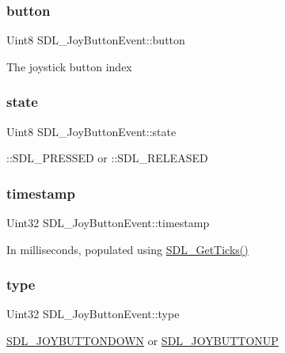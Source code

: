 \subsubsection{\texorpdfstring{button}{button}}
{\footnotesize\ttfamily Uint8 S\+D\+L\+\_\+\+Joy\+Button\+Event\+::button}

The joystick button index \mbox{\label{struct_s_d_l___joy_button_event_ad3b6f8d9aa2c5e694f664b97d12bcd2b}} 
\subsubsection{\texorpdfstring{state}{state}}
{\footnotesize\ttfamily Uint8 S\+D\+L\+\_\+\+Joy\+Button\+Event\+::state}

\+::\+S\+D\+L\+\_\+\+P\+R\+E\+S\+S\+ED or \+::\+S\+D\+L\+\_\+\+R\+E\+L\+E\+A\+S\+ED \mbox{\label{struct_s_d_l___joy_button_event_ab50b6f7d1ab3ac53df69fc2d6cf5fa2a}} 
\subsubsection{\texorpdfstring{timestamp}{timestamp}}
{\footnotesize\ttfamily Uint32 S\+D\+L\+\_\+\+Joy\+Button\+Event\+::timestamp}

In milliseconds, populated using \mbox{\hyperlink{_s_d_l__timer_8h_a0b9bc71d6287e0ffafdc3419760fe2b3}{S\+D\+L\+\_\+\+Get\+Ticks()}} \mbox{\label{struct_s_d_l___joy_button_event_a8f3312a046d37fa2884b93f69c4cb655}} 
\subsubsection{\texorpdfstring{type}{type}}
{\footnotesize\ttfamily Uint32 S\+D\+L\+\_\+\+Joy\+Button\+Event\+::type}

\mbox{\hyperlink{_s_d_l__events_8h_a3b589e89be6b35c02e0dd34a55f3fccaa386ac978bc145a45883fe0adab70710b}{S\+D\+L\+\_\+\+J\+O\+Y\+B\+U\+T\+T\+O\+N\+D\+O\+WN}} or \mbox{\hyperlink{_s_d_l__events_8h_a3b589e89be6b35c02e0dd34a55f3fccaa76f91c81110f012e3a47cbbc0449e3c3}{S\+D\+L\+\_\+\+J\+O\+Y\+B\+U\+T\+T\+O\+N\+UP}} \mbox{\label{struct_s_d_l___joy_button_event_a1679049adad7242b28420948fdc79044}} 
